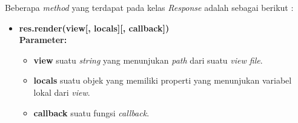 Beberapa \textit{method} yang terdapat pada kelas \textit{Response} adalah sebagai berikut : 

\begin{itemize}
%	
%	
%	
%	
%	
%	
	
	\item \textbf{res.render(view[, locals][, callback])} \\ \textbf{Parameter:}
	\begin{itemize}
		\item \textbf{view} suatu \textit{string} yang menunjukan \textit{path} dari suatu \textit{view file}.
		\item \textbf{locals} suatu objek yang memiliki properti yang menunjukan variabel lokal dari \textit{view}.
		\item \textbf{callback} suatu fungsi \textit{callback}. 
	\end{itemize}
	

\end{itemize}
